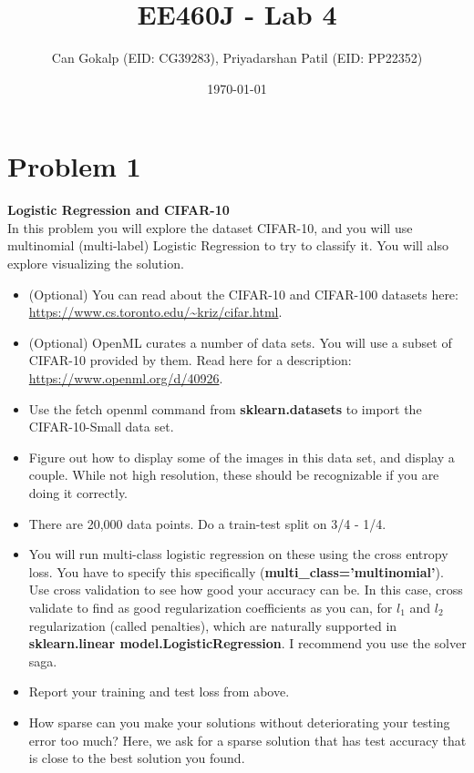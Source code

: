 \documentclass[12pt]{article}%
\begin{document}
\title{EE460J - Lab 4}
\author{Can Gokalp (EID: CG39283), Priyadarshan Patil (EID: PP22352)}
\date{\today}
\maketitle


\section{Problem 1}

\textbf{Logistic Regression and CIFAR-10}\\

In this problem you will explore the dataset CIFAR-10, and you will use multinomial (multi-label) Logistic Regression to try to classify it. You
will also explore visualizing the solution.

\begin{itemize}
    \item (Optional) You can read about the CIFAR-10 and CIFAR-100 datasets here: \url{https://www.cs.toronto.edu/~kriz/cifar.html}.
    \item (Optional) OpenML curates a number of data sets. You will use a subset of CIFAR-10 provided by them. Read here for a description: \url{https://www.openml.org/d/40926}.
    \item Use the fetch openml command from \textbf{sklearn.datasets} to import the CIFAR-10-Small data set.
    \item Figure out how to display some of the images in this data set, and display a couple. While not high resolution, these should be recognizable if you are doing it correctly.
    \item There are 20,000 data points. Do a train-test split on 3/4 - 1/4.
    \item You will run multi-class logistic regression on these using the cross entropy loss. You have to specify this specifically (\textbf{multi\_class='multinomial'}). Use cross validation to see how good your accuracy can be. In this case, cross validate to find as good regularization coefficients as you can, for $l_1$ and $l_2$ regularization (called penalties), which are naturally supported in \textbf{sklearn.linear model.LogisticRegression}. I recommend you use the solver saga.
    \item Report your training and test loss from above.
    \item How sparse can you make your solutions without deteriorating your testing error too much? Here, we ask for a sparse solution that has test accuracy that is close to the best solution you found.
\end{itemize}
\end{document}
